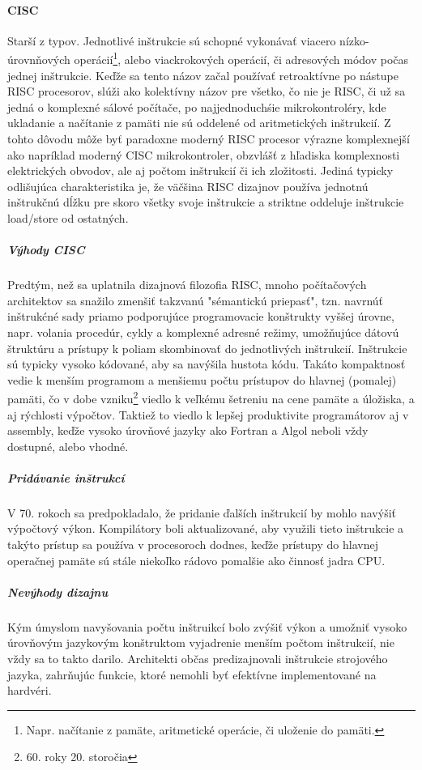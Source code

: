 \documentclass[11pt,a4paper]{report}
\begin{document}
\paragraph{CISC} Starší z typov. Jednotlivé inštrukcie sú schopné vykonávať viacero nízko-úrovnňových operácií\footnote{Napr. načítanie z pamäte, aritmetické operácie, či uloženie do pamäti.}, alebo viackrokových operácií, či adresových módov počas jednej inštrukcie. Keďže sa tento názov začal používať retroaktívne po nástupe RISC procesorov, slúži ako kolektívny názov pre všetko, čo nie je RISC, či už sa jedná o komplexné sálové počítače, po najjednoduchśie mikrokontroléry, kde ukladanie a načítanie z pamäti nie sú oddelené od aritmetických inštrukcií. Z tohto dôvodu môže byť paradoxne moderný RISC procesor výrazne komplexnejší ako napríklad moderný CISC mikrokontroler, obzvlášť z hľadiska komplexnosti elektrických obvodov, ale aj počtom inštrukcií či ich zložitosti. Jediná typicky odlišujúca charakteristika je, že väčšina RISC dizajnov používa jednotnú inštrukčnú dĺžku pre skoro všetky svoje inštrukcie a striktne oddeluje inštrukcie load/store od ostatných.

\subparagraph{Výhody CISC}Predtým, než sa uplatnila dizajnová filozofia RISC, mnoho počítačových architektov sa snažilo zmenšiť takzvanú "sémantickú priepasť", tzn. navrnúť inštrukćné sady priamo podporujúce programovacie konštrukty vyššej úrovne, napr. volania procedúr, cykly a komplexné adresné režimy, umožňujúce dátovú štruktúru a prístupy k poliam skombinovať do jednotlivých inštrukcií. Inštrukcie sú typicky vysoko kódované, aby sa navýšila hustota kódu. Takáto kompaktnosť vedie k menším programom a menšiemu počtu prístupov do hlavnej (pomalej) pamäti, čo v dobe vzniku\footnote{60. roky 20. storočia} viedlo k veľkému šetreniu na cene pamäte a úložiska, a aj rýchlosti výpočtov. Taktiež to viedlo k lepšej produktivite programátorov aj v assembly, keďže vysoko úrovňové jazyky ako Fortran a Algol neboli vždy dostupné, alebo vhodné.

\subparagraph{Pridávanie inštrukcí} V 70. rokoch sa predpokladalo, že pridanie ďalších inštrukcií by mohlo navýšiť výpočtový výkon. Kompilátory boli aktualizované, aby využili tieto inštrukcie a takýto prístup sa používa v procesoroch dodnes, keďže prístupy do hlavnej operačnej pamäte sú stále niekoľko rádovo pomalšie ako činnosť jadra CPU.

\subparagraph{Nevýhody dizajnu} Kým úmyslom navyšovania počtu inštruikcí bolo zvýšiť výkon a umožniť vysoko úrovňovým jazykovým konštruktom vyjadrenie menším počtom inštrukcií, nie vždy sa to takto darilo. Architekti občas predizajnovali inštrukcie strojového jazyka, zahrňujúc funkcie, ktoré nemohli byť efektívne implementované na hardvéri. 
\end{document}
